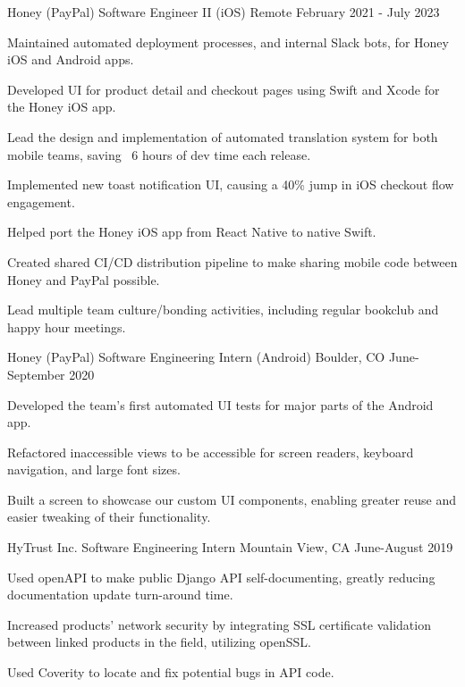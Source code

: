 \documentclass[12pt, a4paper]{awesome-cv}
\begin{document}
\begin{cventries}
  \cventry
    {Honey (PayPal)}
    {Software Engineer II (iOS)}
    {Remote}
    {February 2021 - July 2023}
    {
        \begin{cvitems}
            \item {Maintained automated deployment processes, and internal Slack bots, for Honey iOS and Android apps.}
            \item {Developed UI for product detail and checkout pages using Swift and Xcode for the Honey iOS app.}
            \item {Lead the design and implementation of automated translation system for both mobile teams, saving ~6 hours of dev time each release.}
            \item {Implemented new toast notification UI, causing a 40\% jump in iOS checkout flow engagement.}
            \item {Helped port the Honey iOS app from React Native to native Swift.}
            \item {Created shared CI/CD distribution pipeline to make sharing mobile code between Honey and PayPal possible.}
            \item {Lead multiple team culture/bonding activities, including regular bookclub and happy hour meetings.}
        \end{cvitems}
    }

  \cventry
    {Honey (PayPal)}
    {Software Engineering Intern (Android)}
    {Boulder, CO}
    {June-September 2020}
    {
        \begin{cvitems}
            \item {Developed the team's first automated UI tests for major parts of the Android app.}
            \item {Refactored inaccessible views to be accessible for screen readers, keyboard navigation, and large font sizes.}
            \item {Built a screen to showcase our custom UI components, enabling greater reuse and easier tweaking of their functionality.}
        \end{cvitems}
    }

  \cventry
    {HyTrust Inc.}
    {Software Engineering Intern}
    {Mountain View, CA}
    {June-August 2019}
    {
      \begin{cvitems}
      	  \item {Used openAPI to make public Django API self-documenting, greatly reducing documentation update turn-around time.}
	      \item {Increased products' network security by integrating SSL certificate validation between linked products in the field, utilizing openSSL.}
	      \item {Used Coverity to locate and fix potential bugs in API code.}
      \end{cvitems}
    }


\end{cventries}
\end{document}
